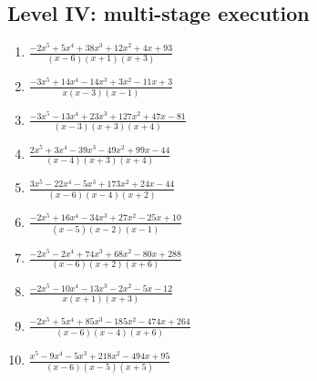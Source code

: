 \documentclass[11pt,oneside]{book}
\begin{document}
\subsection*{Level IV: multi-stage execution}
\begin{enumerate}[leftmargin=*,label=\textbf{\arabic*.},itemsep=0.65\baselineskip]
\item $\displaystyle \frac{- 2 x^{5} + 5 x^{4} + 38 x^{3} + 12 x^{2} + 4 x + 93}{\left(x - 6\right) \left(x + 1\right) \left(x + 3\right)}$
\item $\displaystyle \frac{- 3 x^{5} + 14 x^{4} - 14 x^{3} + 3 x^{2} - 11 x + 3}{x \left(x - 3\right) \left(x - 1\right)}$
\item $\displaystyle \frac{- 3 x^{5} - 13 x^{4} + 23 x^{3} + 127 x^{2} + 47 x - 81}{\left(x - 3\right) \left(x + 3\right) \left(x + 4\right)}$
\item $\displaystyle \frac{2 x^{5} + 3 x^{4} - 39 x^{3} - 49 x^{2} + 99 x - 44}{\left(x - 4\right) \left(x + 3\right) \left(x + 4\right)}$
\item $\displaystyle \frac{3 x^{5} - 22 x^{4} - 5 x^{3} + 173 x^{2} + 24 x - 44}{\left(x - 6\right) \left(x - 4\right) \left(x + 2\right)}$
\item $\displaystyle \frac{- 2 x^{5} + 16 x^{4} - 34 x^{3} + 27 x^{2} - 25 x + 10}{\left(x - 5\right) \left(x - 2\right) \left(x - 1\right)}$
\item $\displaystyle \frac{- 2 x^{5} - 2 x^{4} + 74 x^{3} + 68 x^{2} - 80 x + 288}{\left(x - 6\right) \left(x + 2\right) \left(x + 6\right)}$
\item $\displaystyle \frac{- 2 x^{5} - 10 x^{4} - 13 x^{3} - 2 x^{2} - 5 x - 12}{x \left(x + 1\right) \left(x + 3\right)}$
\item $\displaystyle \frac{- 2 x^{5} + 5 x^{4} + 85 x^{3} - 185 x^{2} - 474 x + 264}{\left(x - 6\right) \left(x - 4\right) \left(x + 6\right)}$
\item $\displaystyle \frac{x^{5} - 9 x^{4} - 5 x^{3} + 218 x^{2} - 494 x + 95}{\left(x - 6\right) \left(x - 5\right) \left(x + 5\right)}$
\end{enumerate}
\end{document}
